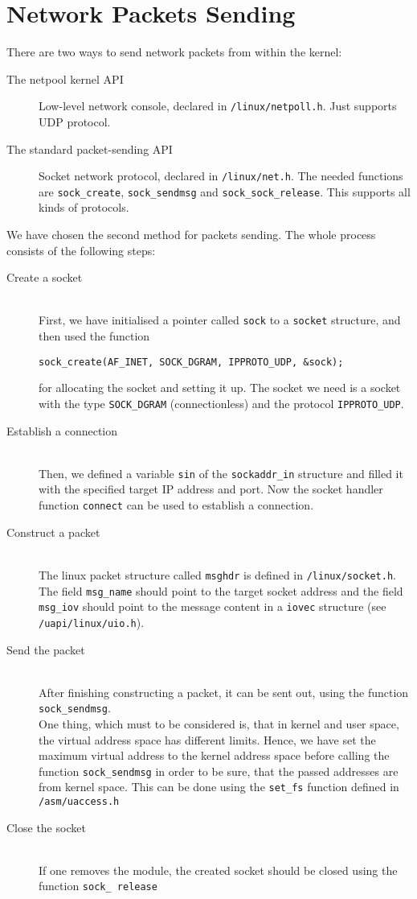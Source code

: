 \section{Network Packets Sending}
There are two ways to send network packets from within the kernel:
\begin{description}
	\item[The netpool kernel API] Low-level network console, declared in \verb+/linux/netpoll.h+. Just supports UDP protocol.
	\item[The standard packet-sending API] Socket network protocol, declared in \verb+/linux/net.h+. The needed functions are \texttt{sock\_create}, \texttt{sock\_sendmsg} and \texttt{sock\_sock\_release}. This supports all kinds of protocols. 
\end{description}
We have chosen the second method for packets sending. The whole process consists of the following steps:
\begin{description}
	\item[Create a socket]\hfill \\
	First, we have initialised a pointer called \texttt{sock} to a \texttt{socket} structure, and then used the function
\lstset{escapechar=,style=customc}
\begin{lstlisting}
sock_create(AF_INET, SOCK_DGRAM, IPPROTO_UDP, &sock);
\end{lstlisting}
for allocating the socket and setting it up. The socket we need is a socket with the type \texttt{SOCK\_DGRAM} (connectionless) and the protocol \texttt{IPPROTO\_UDP}.
  \item[Establish a connection] \hfill\\
	Then, we defined a variable \texttt{sin} of the \texttt{sockaddr\_in} structure and filled it with the specified target IP address and port. Now the socket handler function \texttt{connect} can be used to establish a connection.
	\item[Construct a packet] \hfill \\
The linux packet structure called \texttt{msghdr} is defined in \verb+/linux/socket.h+. The field \texttt{msg\_name} should point to the target socket address and the field \texttt{msg\_iov} should point to the message content in a \texttt{iovec} structure (see \verb+/uapi/linux/uio.h+). 
	\item[Send the packet] \hfill \\
	After finishing constructing a packet, it can be sent out, using the function \texttt{sock\_sendmsg}. \\
	One thing, which must to be considered is, that in kernel and user space, the virtual address space has different limits. Hence, we have set the maximum virtual address to the kernel address space before calling the function \texttt{sock\_sendmsg} in order to be sure, that the passed addresses are from kernel space. This can be done using the \texttt{set\_fs} function defined in \verb+/asm/uaccess.h+
	\item[Close the socket] \hfill \\
	If one removes the module, the created socket should be closed using the function \texttt{sock\_ release}
\end{description}

